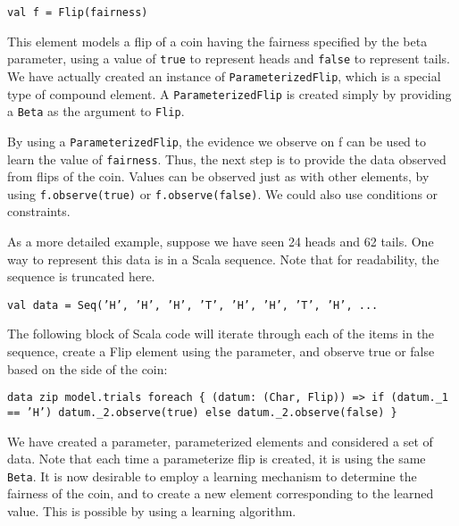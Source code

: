 \begin{flushleft}
\texttt{val f = Flip(fairness)}
\end{flushleft}

This element models a flip of a coin having the fairness specified by the beta parameter, using a value of \texttt{true} to represent heads and \texttt{false} to represent tails. We have actually created an instance of \texttt{ParameterizedFlip}, which is a special type of compound element. A  \texttt{ParameterizedFlip} is created simply by providing a \texttt{Beta} as the argument to \texttt{Flip}.

By using a \texttt{ParameterizedFlip}, the evidence we observe on f can be used to learn the value of \texttt{fairness}. Thus, the next step is to provide the data observed from flips of the coin. Values can be observed just as with other elements, by using \texttt{f.observe(true)} or \texttt{f.observe(false)}. We could also use conditions or constraints.

As a more detailed example, suppose we have seen 24 heads and 62 tails. One way to represent this data is in a Scala sequence. Note that for readability, the sequence is truncated here.

\begin{flushleft}
\texttt{val data = Seq('H', 'H', 'H', 'T', 'H', 'H', 'T', 'H', ...}
\end{flushleft}

The following block of Scala code will iterate through each of the items in the sequence, create a Flip element using the parameter, and observe true or false based on the side of the coin:

\begin{flushleft}
\texttt{data zip model.trials foreach \{
\newline \tab (datum: (Char, Flip)) => if (datum.\_1 == 'H') 
\newline \tab datum.\_2.observe(true) else datum.\_2.observe(false)
\newline \}
}
\end{flushleft}

We have created a parameter, parameterized elements and considered a set of data. Note that each time a parameterize flip is created, it is using the same \texttt{Beta}. It is now desirable to employ a learning mechanism to determine the fairness of the coin, and to create a new element corresponding to the learned value. This is possible by using a learning algorithm.

